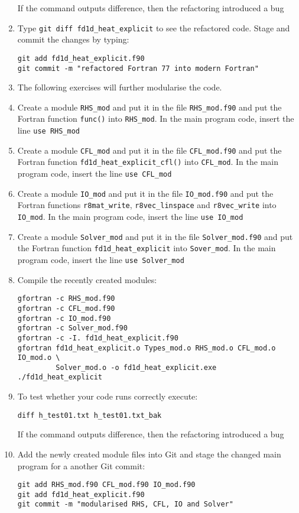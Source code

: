 \documentclass[12pt]{article}
\begin{document}
\begin{enumerate}
If the command outputs difference, then the refactoring introduced a bug
\item Type \texttt{git diff fd1d\_heat\_explicit} to see the refactored code. Stage and commit
the changes by typing: 
\begin{verbatim}
git add fd1d_heat_explicit.f90
git commit -m "refactored Fortran 77 into modern Fortran"
\end{verbatim}
\item[] The following exercises will further modularise the code. 
\item Create a module \texttt{RHS\_mod} and put it in the file \texttt{RHS\_mod.f90} and put the 
Fortran function \texttt{func()} into \texttt{RHS\_mod}. In the main program code, 
insert the line \texttt{use RHS\_mod} 
\item Create a module \texttt{CFL\_mod} and put it in the file \texttt{CFL\_mod.f90} and put the
Fortran function \texttt{fd1d\_heat\_explicit\_cfl()} into \texttt{CFL\_mod}. In the main program
code, insert the line \texttt{use CFL\_mod}
\item Create a module \texttt{IO\_mod} and put it in the file \texttt{IO\_mod.f90} and put
the Fortran functions \texttt{r8mat\_write}, \texttt{r8vec\_linspace} and \texttt{r8vec\_write} into \texttt{IO\_mod}.
In the main program code, insert the line \texttt{use IO\_mod}
\item Create a module \texttt{Solver\_mod} and put it in the file \texttt{Solver\_mod.f90} and put the
  Fortran function \texttt{fd1d\_heat\_explicit} into \texttt{Sover\_mod}. In the main program code,
  insert the line \texttt{use Solver\_mod}
\item Compile the recently created modules:
\begin{verbatim}
gfortran -c RHS_mod.f90
gfortran -c CFL_mod.f90
gfortran -c IO_mod.f90
gfortran -c Solver_mod.f90
gfortran -c -I. fd1d_heat_explicit.f90
gfortran fd1d_heat_explicit.o Types_mod.o RHS_mod.o CFL_mod.o IO_mod.o \
         Solver_mod.o -o fd1d_heat_explicit.exe
./fd1d_heat_explicit
\end{verbatim}
\item To test whether your code runs correctly execute:
\begin{verbatim}
diff h_test01.txt h_test01.txt_bak
\end{verbatim}
If the command outputs difference, then the refactoring introduced a bug
\item Add the newly created module files into Git and stage the changed main program for a
another Git commit:
\begin{verbatim}
git add RHS_mod.f90 CFL_mod.f90 IO_mod.f90
git add fd1d_heat_explicit.f90
git commit -m "modularised RHS, CFL, IO and Solver"
\end{verbatim}
%
\end{enumerate}
\newpage
\end{document}
